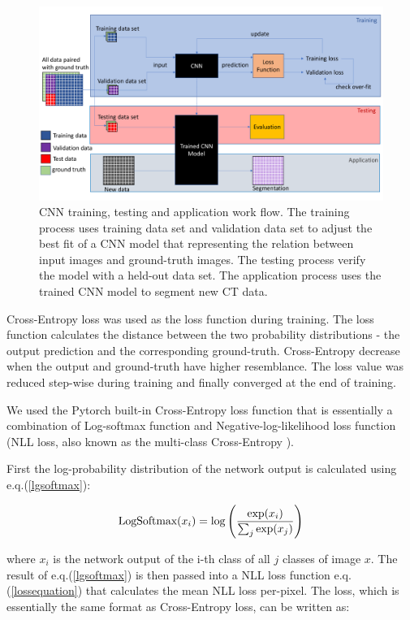 \documentclass[draft,linenumbers]{agujournal2018}
\begin{document}
\begin{figure}[h]
\centering
\includegraphics[width=33pc]{imgs/workfl.pdf}
\caption{CNN training, testing and application work flow. The training process uses training data set and validation data set to adjust the best fit of a CNN model that representing the relation between input images and ground-truth images. The testing process verify the model with a held-out data set. The application process uses the trained CNN model to segment new CT data.}
\label{workfl}
\end{figure}

Cross-Entropy loss was used as the loss function during training. The loss function calculates the distance between the two probability distributions - the output prediction and the corresponding ground-truth. Cross-Entropy decrease when the output and ground-truth have higher resemblance. The loss value was reduced step-wise during training and finally converged at the end of training. 

We used the Pytorch built-in Cross-Entropy loss function that is essentially a combination of Log-softmax function and Negative-log-likelihood loss function (NLL loss, also known as the multi-class Cross-Entropy \citep{bishop2006pattern}).

First the log-probability distribution of the network output is calculated using e.q.(\ref{lgsoftmax}):

\begin{equation}\label{lgsoftmax}
    \centering
    \text{LogSoftmax}(x_{i}) = \log\left(\frac{\exp(x_i) }{ \sum_j \exp(x_j)} \right)
\end{equation}

where $x_i$ is the network output of the i-th class of all $j$ classes of image $x$. The result of e.q.(\ref{lgsoftmax}) is then passed into a NLL loss function e.q.(\ref{lossequation}) that calculates the mean NLL loss per-pixel. The loss, which is essentially the same format as Cross-Entropy loss, can be written as:
\end{document}
